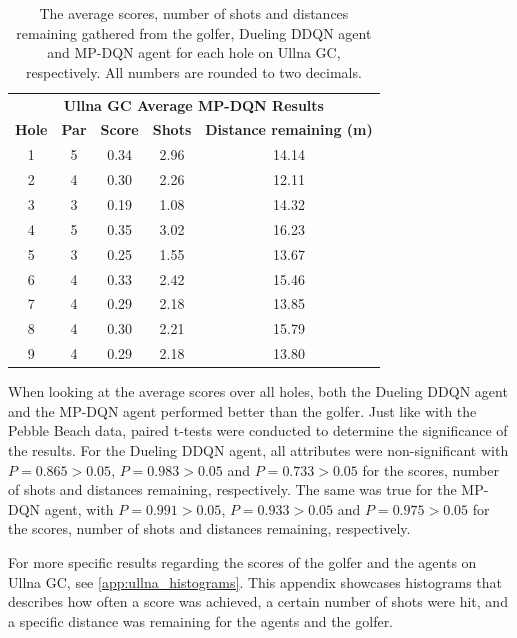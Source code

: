 \documentclass{kththesis}
\begin{document}
\begin{table}
    \begin{subtable}{\textwidth}
    \centering
    \begin{tabular}{c|c|c|c|c}
    \multicolumn{5}{c}{\textbf{Ullna GC Average MP-DQN Results}} \\
        \textbf{Hole} & \textbf{Par} & \textbf{Score} & \textbf{Shots} & \textbf{Distance remaining (m)}  \\ \hline
        1 & 5 & 0.34 & 2.96 & 14.14 \\ 
        2 & 4 & 0.30 & 2.26 & 12.11 \\ 
        3 & 3 & 0.19 & 1.08 & 14.32 \\ 
        4 & 5 & 0.35 & 3.02 & 16.23 \\ 
        5 & 3 & 0.25 & 1.55 & 13.67 \\ 
        6 & 4 & 0.33 & 2.42 & 15.46 \\ 
        7 & 4 & 0.29 & 2.18 & 13.85 \\ 
        8 & 4 & 0.30 & 2.21 & 15.79 \\ 
        9 & 4 & 0.29 & 2.18 & 13.80 \\ 
    \end{tabular}
    \end{subtable}
    \caption{The average scores, number of shots and distances remaining gathered from the golfer, Dueling DDQN agent and MP-DQN agent for each hole on Ullna GC, respectively. All numbers are rounded to two decimals.}
    \label{tab:ullna_average_results}
\end{table}

When looking at the average scores over all holes, both the Dueling DDQN agent and the MP-DQN agent performed better than the golfer. Just like with the Pebble Beach data, paired t-tests were conducted to determine the significance of the results. For the Dueling DDQN agent, all attributes were non-significant with $P = 0.865 > 0.05$, $P = 0.983 > 0.05$ and $P = 0.733 > 0.05$ for the scores, number of shots and distances remaining, respectively. The same was true for the MP-DQN agent, with $P = 0.991 > 0.05$, $P = 0.933 > 0.05$ and $P = 0.975 > 0.05$ for the scores, number of shots and distances remaining, respectively.

For more specific results regarding the scores of the golfer and the agents on Ullna GC, see \autoref{app:ullna_histograms}. This appendix showcases histograms that describes how often a score was achieved, a certain number of shots were hit, and a specific distance was remaining for the agents and the golfer.
\end{document}
